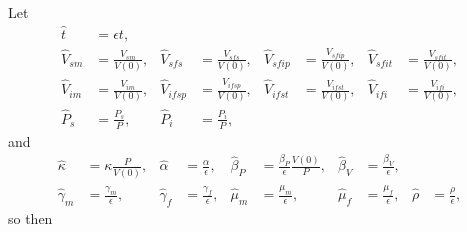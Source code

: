 \documentclass{article}
\begin{document}
Let
\begin{equation}
  \begin{aligned}
    \hat{t} &= \epsilon t,
    \\
    \hat{V}_{sm} &= \frac{V_{sm}}{V(0)},
    &
    \hat{V}_{sfs} &= \frac{V_{sfs}}{V(0)},
    &
    \hat{V}_{sfip} &= \frac{V_{sfip}}{V(0)},
    &
    \hat{V}_{sfit} &= \frac{V_{sfit}}{V(0)},
    \\
    \hat{V}_{im} &= \frac{V_{im}}{V(0)},
    &
    \hat{V}_{ifsp} &= \frac{V_{ifsp}}{V(0)},
    &
    \hat{V}_{ifst} &= \frac{V_{ifst}}{V(0)},
    &
    \hat{V}_{ifi} &= \frac{V_{ifi}}{V(0)},
    \\
    \hat{P}_s &= \frac{P_s}{P},
    &
    \hat{P}_i &= \frac{P_i}{P},
  \end{aligned}
\end{equation}
and
\begin{equation}
  \begin{aligned}
    \hat{\kappa} &= \kappa \frac{P}{V(0)},
    &
    \hat{\alpha} &= \frac{\alpha}{\epsilon},
    &
    \hat{\beta}_P &= \frac{\beta_P}{\epsilon} \frac{V(0)}{P},
    &
    \hat{\beta}_V &= \frac{\beta_V}{\epsilon},
    \\
    \hat{\gamma}_m &= \frac{\gamma_m}{\epsilon},
    &
    \hat{\gamma}_f &= \frac{\gamma_f}{\epsilon},
    &
    \hat{\mu}_m &= \frac{\mu_m}{\epsilon},
    &
    \hat{\mu}_f &= \frac{\mu_f}{\epsilon},
    &
    \hat{\rho} &= \frac{\rho}{\epsilon},
  \end{aligned}
\end{equation}
so then
\end{document}
